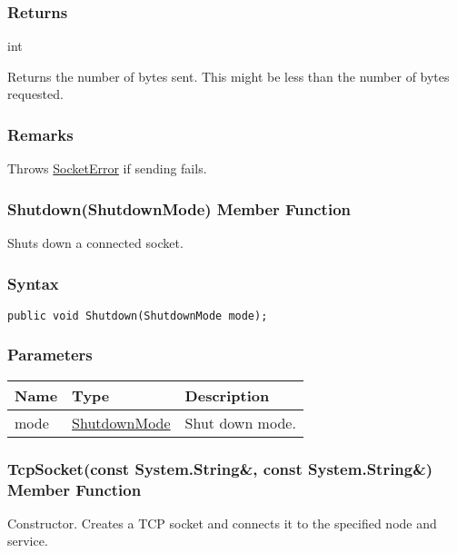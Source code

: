 \documentclass[a4paper,oneside,11.000000pt]{book}
\begin{document}
\subsubsection*{Returns}int
\begin{flushleft}
Returns the number of bytes sent.
This might be less than the number of bytes requested.

\end{flushleft}
\subsubsection*{Remarks}
\begin{flushleft}
Throws \hyperlink{System.Net.Sockets.SocketError}{SocketError} if sending fails.

\end{flushleft}
\clearpage

\hypertarget{System.Net.Sockets.TcpSocket.Shutdown.P.System.Net.Sockets.TcpSocket.ShutdownMode}{\subsubsection*{Shutdown(ShutdownMode) Member Function}}\begin{flushleft}
Shuts down a connected socket.

\end{flushleft}

\subsubsection*{Syntax}\texttt{public void Shutdown(ShutdownMode mode);}
\subsubsection*{Parameters}
\begin{flushleft}
\begin{supertabular}[l]{lll}
\textbf{Name}
& \textbf{Type}
& \textbf{Description}
\\
\hline
mode
& \hyperlink{ShutdownMode}{ShutdownMode}
& Shut down mode.

\\
\end{supertabular}

\end{flushleft}
\clearpage

\hypertarget{System.Net.Sockets.TcpSocket.constructor.P.System.Net.Sockets.TcpSocket.C.R.System.String.C.R.System.String}{\subsubsection*{TcpSocket(const System.String\&, const System.String\&) Member Function}}
\begin{flushleft}
Constructor. Creates a TCP socket and connects it to the specified node and service.

\end{flushleft}
\end{document}
